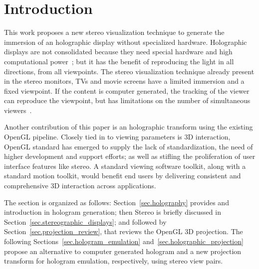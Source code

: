 \section{Introduction}
\label{sec.introduction}

This work proposes a new stereo visualization technique to generate the immersion of an holographic display without specialized hardware. Holographic displays are not consolidated because they need special hardware and high computational power~\cite{Lucente1992, Watlington1995, Lucente2012}; but it has the benefit of reproducing the light in all directions, from all viewpoints. The stereo visualization technique already present in the stereo monitors, TVs and movie screens have a limited immersion and a fixed viewpoint. If the content is computer generated, the tracking of the viewer can reproduce the viewpoint, but has limitations on the number of simultaneous viewers~\cite{Harris2010}.

Another contribution of this paper is an holographic transform using the existing OpenGL pipeline. Closely tied in to viewing parameters is 3D interaction, OpenGL standard has emerged to supply the lack of standardization, the need of higher development and support efforts; as well as stifling the proliferation of user interface features like stereo. A standard viewing software toolkit, along with a standard motion toolkit, would benefit end users by delivering consistent and comprehensive 3D interaction across applications.

The section is organized as follows: Section~\ref{sec.holography} provides and introduction in hologram generation; then Stereo is briefly discussed in Section~\ref{sec.stereographic_displays}; and followed by Section~\ref{sec.projection_review}, that reviews the OpenGL 3D projection. The following Sections~\ref{sec.hologram_emulation} and~\ref{sec.holographic_projection} propose an alternative to computer generated hologram and a new projection transform for hologram emulation, respectively, using stereo view pairs.

